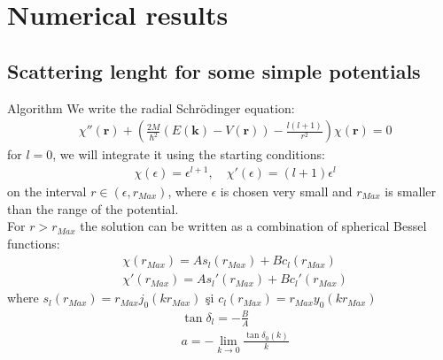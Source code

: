 \section{Numerical results}

\subsection{Scattering lenght for some simple potentials}
\begin{frame}[allowframebreaks]{Algorithm}
We write the radial Schr\"{o}dinger equation:
\begin{align}
&\chi''({\bm r})+(\frac{2M}{\hbar^2}(E({\bm k})-V({\bm r}))-\frac{l(l+1)}{r^2})\chi({\bm r})=0 \label{srad}
\end{align}
for $l=0$, we will integrate it using the starting conditions:
\begin{align}
 &\chi(\epsilon)=\epsilon^{l+1},\quad \chi'(\epsilon)=(l+1)\epsilon^l
\end{align}
on the interval $r\in (\epsilon,r_{Max})$, where $\epsilon$ is chosen very small and $r_{Max}$ is smaller than the range of the potential.\\
For $r>r_{Max}$ the solution can be written as a combination of spherical Bessel functions:
 \begin{align}
&\chi(r_{Max})=A s_l(r_{Max}) +B c_l(r_{Max})\label{eq1}\\
&\chi'(r_{Max})=A s_l'(r_{Max}) +B c_l'(r_{Max})\label{eq2}
\end{align}
where $s_l(r_{Max})=r_{Max}j_0(k r_{Max})$ \c{s}i $c_l(r_{Max})=r_{Max} y_0 (k r_{Max})$
\begin{align}
&\tan \delta_l=-\frac{B}{A}\\
&a=-\lim_{k\to 0}\frac{\tan\delta_0(k)}{k}
\end{align}
\end{frame}

